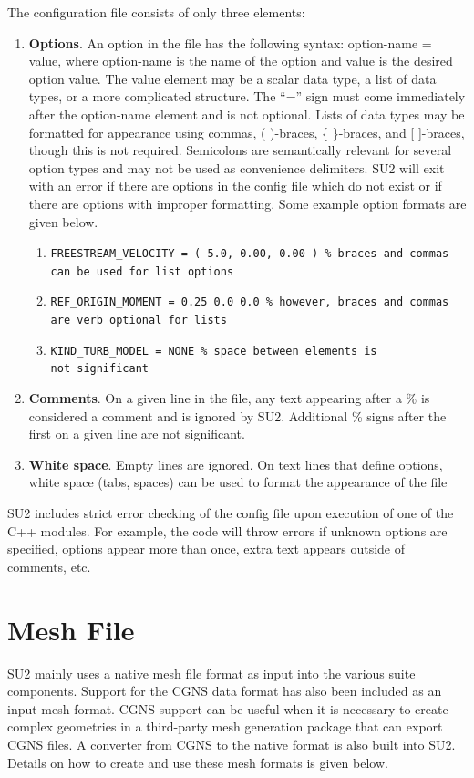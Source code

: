 \documentclass[12pt, a4paper, twoside]{article}
\begin{document}
The configuration file consists of only three elements:
\begin{enumerate}
    \item \textbf{Options}. An option in the file has the following syntax: option-name = value, where option-name is the name of the option and value is the desired option value. The value element may be a scalar data type, a list of data types, or a more complicated structure. The “=” sign must come immediately after the option-name element and is not optional. Lists of data types may be formatted for appearance using commas, ( )-braces, \{ \}-braces, and [ ]-braces, though this is not required. Semicolons are semantically relevant for several option types and may not be used as convenience delimiters. SU2 will exit with an error if there are options in the config file which do not exist or if there are options with improper formatting. Some example option formats are given below. 
    \begin{enumerate}
        \item \texttt{FREESTREAM\_VELOCITY = ( 5.0, 0.00, 0.00 ) \% braces and commas \\can be used for list options}
        \item \texttt{REF\_ORIGIN\_MOMENT = 0.25 0.0 0.0 \% however, braces and commas \\are verb optional for lists}
        \item \texttt{KIND\_TURB\_MODEL = NONE \% space between elements is \\not significant}

    \end{enumerate}
    \item \textbf{Comments}. On a given line in the file, any text appearing after a \% is considered a comment and is ignored by SU2. Additional \% signs after the first on a given line are not significant.
    \item \textbf{White space}. Empty lines are ignored. On text lines that define options, white space (tabs, spaces) can be used to format the appearance of the file
\end{enumerate}

SU2 includes strict error checking of the config file upon execution of one of the C++ modules. For example, the code will throw errors if unknown options are specified, options appear more than once, extra text appears outside of comments, etc.


\newpage
\section{Mesh File}
SU2 mainly uses a native mesh file format as input into the various suite components. Support for the CGNS data format has also been included as an input mesh format. CGNS support can be useful when it is necessary to create complex geometries in a third-party mesh generation package that can export CGNS files. A converter from CGNS to the native format is also built into SU2. Details on how to create and use these mesh formats is given below.
\end{document}
